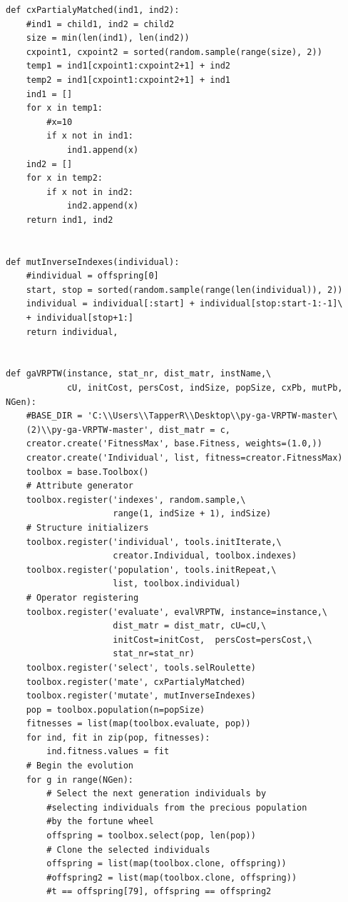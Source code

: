 \documentclass[a4paper,12pt,parskip,bibtotoc,liststotoc]{article}
\begin{document}
\begin{appendix}
\begin{lstlisting}
def cxPartialyMatched(ind1, ind2):
    #ind1 = child1, ind2 = child2
    size = min(len(ind1), len(ind2))
    cxpoint1, cxpoint2 = sorted(random.sample(range(size), 2))
    temp1 = ind1[cxpoint1:cxpoint2+1] + ind2
    temp2 = ind1[cxpoint1:cxpoint2+1] + ind1
    ind1 = []
    for x in temp1:
        #x=10
        if x not in ind1:
            ind1.append(x)
    ind2 = []
    for x in temp2:
        if x not in ind2:
            ind2.append(x)
    return ind1, ind2


def mutInverseIndexes(individual):
    #individual = offspring[0]
    start, stop = sorted(random.sample(range(len(individual)), 2))
    individual = individual[:start] + individual[stop:start-1:-1]\
    + individual[stop+1:]
    return individual,


def gaVRPTW(instance, stat_nr, dist_matr, instName,\
            cU, initCost, persCost, indSize, popSize, cxPb, mutPb, NGen):
    #BASE_DIR = 'C:\\Users\\TapperR\\Desktop\\py-ga-VRPTW-master\
    (2)\\py-ga-VRPTW-master', dist_matr = c, 
    creator.create('FitnessMax', base.Fitness, weights=(1.0,))
    creator.create('Individual', list, fitness=creator.FitnessMax)
    toolbox = base.Toolbox()
    # Attribute generator
    toolbox.register('indexes', random.sample,\
                     range(1, indSize + 1), indSize)
    # Structure initializers
    toolbox.register('individual', tools.initIterate,\
                     creator.Individual, toolbox.indexes)
    toolbox.register('population', tools.initRepeat,\
                     list, toolbox.individual)
    # Operator registering
    toolbox.register('evaluate', evalVRPTW, instance=instance,\
                     dist_matr = dist_matr, cU=cU,\
                     initCost=initCost,  persCost=persCost,\
                     stat_nr=stat_nr)
    toolbox.register('select', tools.selRoulette)
    toolbox.register('mate', cxPartialyMatched)
    toolbox.register('mutate', mutInverseIndexes)
    pop = toolbox.population(n=popSize)
    fitnesses = list(map(toolbox.evaluate, pop))
    for ind, fit in zip(pop, fitnesses):
        ind.fitness.values = fit
    # Begin the evolution
    for g in range(NGen):
        # Select the next generation individuals by
        #selecting individuals from the precious population 
        #by the fortune wheel
        offspring = toolbox.select(pop, len(pop))
        # Clone the selected individuals
        offspring = list(map(toolbox.clone, offspring))
        #offspring2 = list(map(toolbox.clone, offspring))
        #t == offspring[79], offspring == offspring2
        


\end{lstlisting}
\end{appendix}
\end{document}

